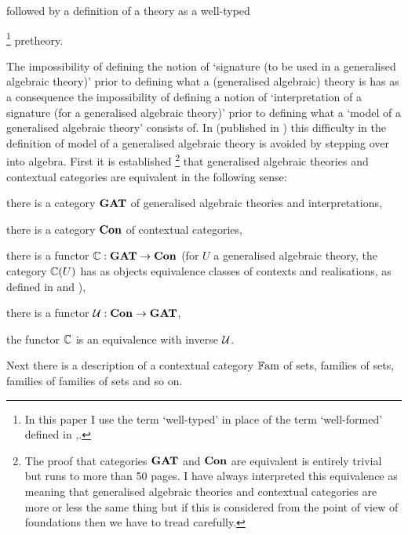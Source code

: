 followed by a definition of a theory as a well-typed{\footnote{In this paper I use the term `well-typed' in place of the term `well-formed' defined in \cite{Cartmell78},\cite{Cartmell86}.} pretheory. 

\note The impossibility of defining the notion of `signature (to be used in a generalised algebraic theory)' prior to defining
what a (generalised algebraic) theory is has as a consequence
the impossibility of defining a notion of `interpretation of a signature (for a generalised algebraic theory)' prior to 
defining what a `model of a generalised algebraic theory' consists of.  In \cite{Cartmell78} (published in \cite{Cartmell86}) this difficulty
in the definition of model of a generalised algebraic theory is avoided by stepping over into algebra.
First  it is established \footnote{
The proof that categories $\catGAT$ and $\catCon$ are equivalent  is entirely trivial but runs to more than 50 pages. I have always interpreted this equivalence as meaning that generalised algebraic theories and contextual categories are more or less the same thing but if this is considered from the point of view of foundations then we have to tread carefully.} 
that  generalised algebraic theories and contextual categories are equivalent in the following sense: 
\noindent \label{ccgatequivalence}
\begin{point}
there is a category $\catGAT$ of generalised algebraic theories and interpretations,
\end{point}
\begin{point}
there is a category $\catCon$ of contextual categories,
\end{point}
\begin{point}
there is a functor $\ccat[C]: \catGAT \morph \catCon$  (for $U$ a generalised algebraic theory, the category $\ccat[C](U)$ 
has as objects equivalence classes of contexts and realisations, as defined 
in \cite{Cartmell78} and  \cite{Cartmell86}), 
\end{point}
\begin{point}
there is a functor $\gat[U]:\catCon \morph \catGAT$,
\end{point}
\begin{point}
the functor $\ccat[C]$ is an equivalence with inverse $\gat[U]$.
\end{point}
Next there is a description of
a contextual category $\Fam$ of sets, families of sets, families of families of sets and so on. 

}
